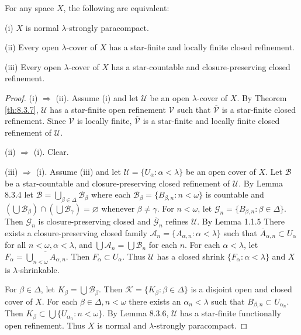 \documentclass[jiang8iv.tex]{subfiles}
\begin{document}
{\theorem{\label{th:8.3.8}} 
For any space $X$, the following are equivalent:

\textup{(i)} $X$ is normal $\lambda$-strongly paracompact.

\textup{(ii)} Every open $\lambda$-cover of $X$ has a star-finite and locally finite
 closed refinement.

\textup{(iii)}  Every open $\lambda$-cover  of $X$ has a star-countable and 
closure-preserving closed refinement.
}

\begin{proof}  (i) $\Rightarrow$ (ii).
Assume (i) and let $\mathscr{U}$ be an open $\lambda$-cover of $X$.
By Theorem \ref{th:8.3.7}, $\mathscr{U}$ has a star-finite open refinement $\mathscr{V}$ such that
$\mathscr{\overline{V}}$ is a star-finite closed refinement.
Since $\mathscr{V}$ is locally finite, $\mathscr{\overline{V}}$ is a star-finite and locally finite closed refinement of $\mathscr{U}$.

(ii) $\Rightarrow$ (i). Clear.

(iii) $\Rightarrow$ (i).
Assume (iii) and let  $\mathscr{U}= \{U_\alpha: \alpha<\lambda\}$  be an open cover of $X$.
Let $\mathscr{B}$ be a star-countable and closure-preserving closed refinement of $\mathscr{U}$.
By Lemma 8.3.4 let $\mathscr{B} = \bigcup_{\beta \in \Delta} \mathscr{B}_\beta$ where each $\mathscr{B}_\beta=\{B_{\beta,n} : n < \omega\}$ is countable and $(\bigcup \mathscr{B}_\beta) \cap (\bigcup \mathscr{B}_\gamma) = \varnothing$ whenever $\beta \neq \gamma$.
For $n<\omega$, let $\mathscr{G}_n = \{B_{\beta,n} : \beta \in \Delta\}$.
Then $\mathscr{G}_n$ is closure-preserving closed and $\overline{\mathscr{G}}_n$ 
refines $\mathscr{U}$.
By Lemma 1.1.5 There exists a closure-preserving closed family 
$\mathscr{A}_n = \{A_{\alpha,n}: \alpha < \lambda\}$ such that $\overline{A}_{\alpha,n} \subset U_\alpha$ 
for all $n<\omega, \alpha<\lambda$, and $\bigcup \mathscr{A}_n = \bigcup \mathscr{B}_n$ for each $n$.
For each $\alpha<\lambda$, let $F_\alpha = \overline{\bigcup_{n < \omega} A_{\alpha,n}}$.
Then $F_\alpha \subset U_\alpha$.
Thus $\mathscr{U}$ has a closed shrink
$\{F_\alpha: \alpha < \lambda\}$ and $X$ is $\lambda$-shrinkable.

For $\beta \in \Delta$, let $K_\beta = \bigcup \mathscr{B}_\beta$.
Then $\mathscr{K} = \{K_\beta : \beta \in \Delta\}$ is a disjoint open and closed cover of $X$.
For each $\beta \in \Delta, n < \omega$ there exists an $\alpha_n<\lambda$ such that 
$B_{\beta,n} \subset U_{\alpha_n}$. Then 
$K_\beta \subset\bigcup \{U_{\alpha_n}: n < \omega\}$.
By Lemma 8.3.6, $\mathscr{U}$ has a star-finite functionally open refinement. Thus $X$ is normal and $\lambda$-strongly paracompact.
\end{proof}
\end{document}
